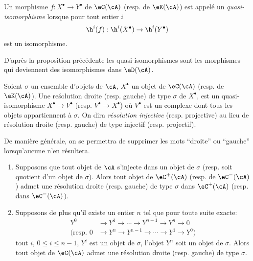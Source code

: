 \begin{definition}\label{VIII:3-1-7}
Un morphisme $f:X^\bullet \to Y^\bullet$ de $\eC(\cA)$ (resp. de $\eK(\cA)$) 
est appelé un \emph{quasi-isomorphisme} lorsque pour tout entier $i$ 
\[
  \h^i(f):\h^i(X^\bullet) \to \h^i(Y^\bullet) 
\]
est un isomorphisme. 
\end{definition}

D'après la proposition précédente les quasi-isomorphismes sont les 
morphismes qui deviennent des isomorphismes dans $\eD(\cA)$. 





\begin{definition}\label{VIII:3-1-8}
Soient $\sigma$ un ensemble d'objets de $\cA$, $X^\bullet$ un objet de 
$\eC(\cA)$ (resp. de $\eK(\cA)$). Une re\'solution droite (resp. gauche) de type 
$\sigma$ de $X^\bullet$, est un quasi-isomorphisme $X^\bullet \to V^\bullet$ 
(resp. $V^\bullet \to X^\bullet$) où $V^\bullet$ est un complexe dont tous 
les objets appartiennent à $\sigma$. On dira \emph{résolution injective} 
(resp. projective) au lieu de résolution droite (resp. gauche) de type 
injectif (resp. projectif). 
\end{definition}

De manière générale, on se permettra de supprimer les mots ``droite'' ou 
``gauche'' lorsqu'aucune  n'en résultera. 





\begin{proposition}\label{VIII:3-1-9}
\begin{enumerate}
  \item Supposons que tout objet de $\cA$ s'injecte dans un objet de $\sigma$ 
    (resp. soit quotient d'un objet de $\sigma$). Alors tout objet de 
    $\eC^+(\cA)$ (resp. de $\eC^-(\cA)$) admet une résolution droite 
    (resp. gauche) de type $\sigma$ dans $\eC^+(\cA)$ (resp. dans 
    $\eC^-(\cA)$). 
  \item Supposons de plus qu'il existe un entier $n$ tel que pour toute suite 
    exacte: 
    \begin{align*}
      Y^0 &\to Y^1 \to \cdots \to Y^{n-1} \to Y^n \to 0 \\
      \text{(resp. } 0 &\to Y^n \to Y^{n-1} \to \cdots \to Y^1 \to Y^0 \text{)} 
    \end{align*}
     tout $i$, $0\leqslant i\leqslant n-1$, $Y^i$ est 
    un objet de $\sigma$, l'objet $Y^n$ soit un objet de $\sigma$. Alors tout 
    objet de $\eC(\cA)$ admet une résolution droite (resp. gauche) de type 
    $\sigma$. 
\end{enumerate}
\end{proposition}










